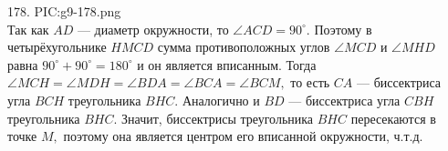 178. {{PIC:g9-178.png}}\\
Так как $AD$ --- диаметр окружности, то $ \angle ACD = 90^\circ.$ Поэтому в четырёхугольнике $HMCD$ сумма противоположных углов $\angle MCD$ и $\angle MHD$ равна $90^\circ+90^\circ=180^\circ$ и он является вписанным. Тогда $\angle MCH = \angle MDH = \angle BDA =  \angle BCA =  \angle BCM,$
то есть $CA$ --- биссектриса угла $BCH$ треугольника $BHC.$
Аналогично и $BD$ --- биссектриса угла $CBH$ треугольника $BHC.$ Значит, биссектрисы треугольника $BHC$ пересекаются в точке $M,$ поэтому она является центром его вписанной окружности, ч.т.д.\\
